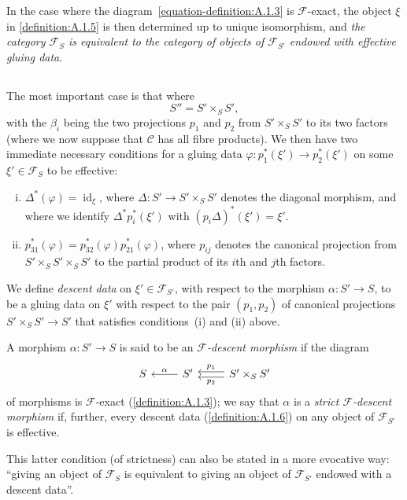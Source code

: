 \documentclass{article}
\theoremstyle{plain}
\theoremstyle{definition}
\newenvironment{definition}[1]
  {\renewcommand\theinnercustomdefinition{#1}\innercustomdefinition}
  {\endinnercustomdefinition}
\newcommand{\sh}[1]{{\mathscr{#1}}}
\newcommand{\cat}[1]{{\mathcal{#1}}}
\DeclareMathOperator{\id}{id}
\newcommand{\oldpage}[1]{\marginpar{\footnotesize$\Big\vert$ \textit{p.~#1}}}
\begin{document}
In the case where the diagram~\cref{equation-definition:A.1.3} is $\sh{F}$-exact, the object $\xi$ in \cref{definition:A.1.5} is then determined up to unique isomorphism, and \emph{the category $\sh{F}_S$ is equivalent to the category of objects of $\sh{F}_{S'}$ endowed with effective gluing data}.


\subsection{}
\label{A.1.c}
The most important case is that where
\[
  S'' = S' \times_S S',
\]
with the $\beta_i$ being the two projections $p_1$ and $p_2$ from $S'\times_S S'$ to its two factors (where we now suppose that $\cat{C}$ has all fibre products).
We then have two immediate necessary conditions for a gluing data $\varphi\colon p_1^*(\xi')\to p_2^*(\xi')$ on some $\xi'\in\sh{F}_S$ to be effective:
\begin{enumerate}[(i)]
  \item $\Delta^*(\varphi) = \id_\xi$, where $\Delta\colon S'\to S'\times_S S'$ denotes the diagonal morphism, and where we identify $\Delta^* p_i^*(\xi')$ with $(p_i\Delta)^*(\xi')=\xi'$.
  \item $p_{31}^*(\varphi) = p_{32}^*(\varphi)p_{21}^*(\varphi)$,
\oldpage{190-05}
  where $p_{ij}$ denotes the canonical projection from $S'\times_S S'\times_S S'$ to the partial product of its $i$th and $j$th factors.
\end{enumerate}

\begin{definition}{1.6}
\label{definition:A.1.6}
  We define \emph{descent data} on $\xi'\in\sh{F}_{S'}$, with respect to the morphism $\alpha\colon S'\to S$, to be a gluing data on $\xi'$ with respect to the pair $(p_1,p_2)$ of canonical projections $S'\times_S S'\to S'$ that satisfies conditions~(i) and (ii) above.
\end{definition}

\begin{definition}{1.7}
\label{definition:A.1.7}
  A morphism $\alpha\colon S'\to S$ is said to be an \emph{$\sh{F}$-descent morphism} if the diagram
  \[
    \begin{tikzcd}
      S
      & S' \lar[swap,"\alpha"]
      & S'\times_S S' \lar[shift left=1,"p_2"] \lar[shift right=1,swap,"p_1"]
    \end{tikzcd}
  \]
  of morphisms is $\sh{F}$-exact (\cref{definition:A.1.3});
  we say that $\alpha$ is a \emph{strict $\sh{F}$-descent morphism} if, further, every descent data (\cref{definition:A.1.6}) on any object of $\sh{F}_{S'}$ is effective.

  This latter condition (of strictness) can also be stated in a more evocative way:
  ``giving an object of $\sh{F}_S$ is equivalent to giving an object of $\sh{F}_{S'}$ endowed with a descent data''.
\end{definition}
\end{document}

